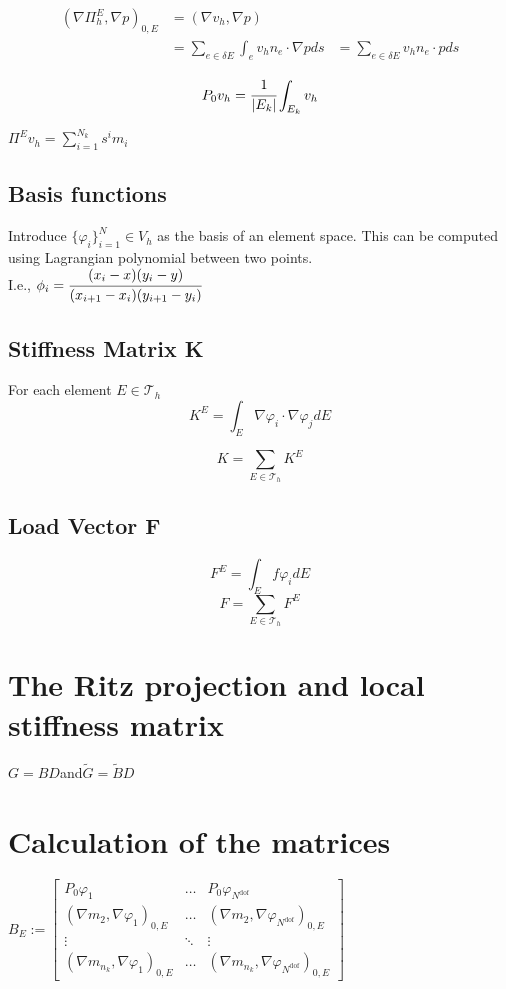 \documentclass{article}
\begin{document}
\begin{align*}
(\nabla\Pi^E_h,\nabla p)_{0,E} &= (\nabla v_h,\nabla p)\\
&= \sum_{e\in \delta E}\int_e v_hn_e\cdot\nabla pds 
&= \sum_{e\in \delta E} v_hn_e\cdot pds 
\end{align*}

$$P_0v_h = \cfrac{1}{|E_k|}\int_{E_k}v_h$$

$\Pi^Ev_h = \sum_{i=1}^{N_k}s^im_i$

\subsection{Basis functions}
Introduce $\{\varphi_i\}^N_{i=1} \in V_h$ as the basis of an element space. This can be computed using Lagrangian polynomial between two points.\\
I.e., $\phi_i = \cfrac{(x_i-x)(y_i-y)}{(x_{i+1}-x_i)(y_{i+1}-y_i)}$



\subsection{Stiffness Matrix K}
For each element $E \in \mathcal{T}_h$
$$K^E = \int_E\nabla\varphi_i\cdot\nabla\varphi_j dE$$

\begin{equation}
    K = \sum_{E \in \mathcal{T}_h}K^E
\end{equation}

\subsection{Load Vector F}

$$F^E = \int_Ef\varphi_i dE$$
\begin{equation}
    F = \sum_{E \in \mathcal{T}_h}F^E
\end{equation}


\section{The Ritz projection and local stiffness matrix}
$G = BD $and$ \tilde{G} = \tilde{B}D$

\section{Calculation of the matrices}

$B_E := \begin{bmatrix}
    P_0\varphi_1 & \hdots & P_0 \varphi_{N^\text{dof}}\\
    (\nabla m_2,\nabla\varphi_1)_{0,E} & \hdots & (\nabla m_2,\nabla\varphi_{N^\text{dof}})_{0,E} \\
    \vdots & \ddots & \vdots \\
    (\nabla m_{n_k},\nabla\varphi_1)_{0,E} & \hdots & (\nabla m_{n_k},\nabla\varphi_{N^\text{dof}})_{0,E}
\end{bmatrix}$
\\
\end{document}
